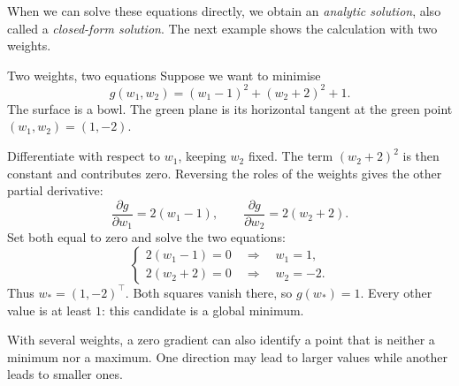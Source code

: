 \documentclass[a4paper,12pt,oneside]{report}
\begin{document}
When we can solve these equations directly, we obtain an
\emph{analytic solution}, also called a \emph{closed-form solution}.
The next example shows the calculation with two weights.

\begin{framedexample}{Two weights, two equations}
Suppose we want to minimise
\[
  g(w_1,w_2)=(w_1-1)^2+(w_2+2)^2+1.
\]
The surface is a bowl. The green plane is its horizontal tangent
at the green point $(w_1,w_2)=(1,-2)$.

\begin{center}
\end{center}

Differentiate with respect to $w_1$, keeping $w_2$ fixed. The term
$(w_2+2)^2$ is then constant and contributes zero. Reversing the roles
of the weights gives the other partial derivative:
\[
  \frac{\partial g}{\partial w_1}=2(w_1-1),\qquad
  \frac{\partial g}{\partial w_2}=2(w_2+2).
\]
Set both equal to zero and solve the two equations:
\[
  \begin{cases}
    2(w_1-1)=0\quad\Longrightarrow\quad w_1=1,\\
    2(w_2+2)=0\quad\Longrightarrow\quad w_2=-2.
  \end{cases}
\]
Thus $w_*=(1,-2)^\top$. Both squares vanish there, so $g(w_*)=1$.
Every other value is at least $1$: this candidate is a global minimum.
\end{framedexample}

\clearpage
With several weights, a zero gradient can also identify a point
that is neither a minimum nor a maximum. One direction may lead
to larger values while another leads to smaller ones.
\end{document}
